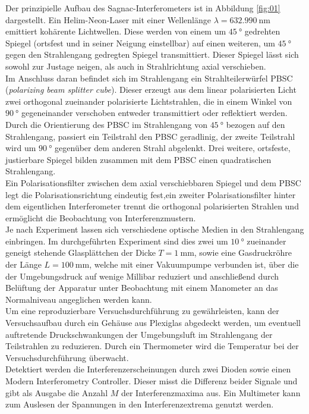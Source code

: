 \noindent Der prinzipielle Aufbau des Sagnac-Interferometers ist in Abbildung
\ref{fig:01} dargestellt. Ein Helim-Neon-Laser mit einer Wellenlänge
$\lambda = \SI{632.990}{\nano\meter}$ emittiert kohärente Lichtwellen. Diese
werden von einem um $\SI{45}{\degree}$ gedrehten Spiegel (ortsfest und in seiner
Neigung einstellbar) auf einen weiteren, um $\SI{45}{\degree}$ gegen den
Strahlengang gedregten Spiegel transmittiert. Dieser Spiegel lässt sich sowohl
zur Justage neigen, als auch in Strahlrichtung axial verschieben. \\
\noindent Im Anschluss daran befindet sich im Strahlengang ein Strahlteilerwürfel
PBSC (\textit{polarizing beam splitter cube}). Dieser erzeugt aus dem linear
polarisierten Licht zwei orthogonal zueinander polarisierte Lichtstrahlen, die
in einem Winkel von $\SI{90}{\degree}$ gegeneinander verschoben entweder
transmittiert oder reflektiert werden. Durch die Orientierung des PBSC im
Strahlengang von $\SI{45}{\degree}$ bezogen auf den Strahlengang, passiert ein
Teilstrahl den PBSC geradlinig, der zweite Teilstrahl wird um $\SI{90}{\degree}$
gegenüber dem anderen Strahl abgelenkt. Drei weitere, ortsfeste, justierbare
Spiegel bilden zusammen mit dem PBSC einen quadratischen Strahlengang. \\
\noindent Ein Polarisationsfilter zwischen dem axial verschiebbaren Spiegel und
dem PBSC legt die Polarisationsrichtung eindeutig fest,ein zweiter
Polarisationsfilter hinter dem eigentlichen Interferometer trennt die
orthogonal polarisierten Strahlen und ermöglicht die Beobachtung von
Interferenzmustern. \\
\noindent Je nach Experiment lassen sich verschiedene optische Medien in den
Strahlengang einbringen. Im durchgeführten Experiment sind dies zwei um
$\SI{10}{\degree}$ zueinander geneigt stehende Glasplättchen der Dicke
$T=\SI{1}{\milli\meter}$, sowie eine Gasdruckröhre der Länge
$L = \SI{100}{\milli\meter}$, welche mit einer Vakuumpumpe verbunden ist, über
die der Umgebungsdruck auf wenige Millibar reduziert und anschließend durch
Belüftung der Apparatur unter Beobachtung mit einem Manometer an das Normalniveau
angeglichen werden kann. \\
\noindent Um eine reproduzierbare Versuchsdurchführung zu gewährleisten, kann der
Versuchsaufbau durch ein Gehäuse aus Plexiglas abgedeckt werden, um eventuell
auftretende Druckschwankungen der Umgebungsluft im Strahlengang der Teilstrahlen
zu reduzieren. Durch ein Thermometer wird die Temperatur bei der
Versuchsdurchführung überwacht.  \\
\noindent Detektiert werden die Interferenzerscheinungen durch zwei Dioden
sowie einen Modern Interferometry Controller. Dieser misst die Differenz beider
Signale und gibt als Ausgabe die Anzahl $M$ der Interferenzmaxima aus. Ein
Multimeter kann zum Auslesen der Spannungen in den Interferenzextrema genutzt
werden. \\
